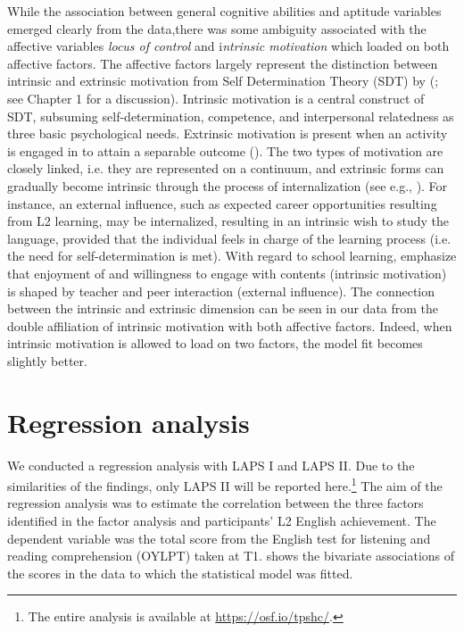 \documentclass[output=paper]{langsci/langscibook}
\begin{document}
While the association between general cognitive abilities and aptitude variables emerged clearly from the data,there was some ambiguity associated with the affective variables \textit{locus of control} and i\textit{ntrinsic motivation} which loaded on both affective factors. The affective factors largely represent the distinction between intrinsic and extrinsic motivation from Self Determination Theory (SDT) by \citeauthor{DeciRyan1985} (\citeyear{DeciRyan1985, DeciRyan2002}; see Chapter 1 for a discussion). Intrinsic motivation is a central construct of SDT, subsuming self-determination, competence, and interpersonal relatedness as three basic psychological needs. Extrinsic motivation is present when an activity is engaged in to attain a separable outcome (\citealt[60]{DeciRyan2000}). The two types of motivation are closely linked, i.e. they are represented on a continuum, and extrinsic forms can gradually become intrinsic through the process of internalization (see e.g., \citealt{DeciRyan1985}). For instance, an external influence, such as expected career opportunities resulting from L2 learning, may be internalized, resulting in an intrinsic wish to study the language, provided that the individual feels in charge of the learning process (i.e. the need for self-determination is met). With regard to school learning,  \citet[64]{DeciRyan2000} emphasize that enjoyment of and willingness to engage with contents (intrinsic motivation) is shaped by teacher and peer interaction (external influence). The connection between the intrinsic and extrinsic dimension can be seen in our data from the double affiliation of intrinsic motivation with both affective factors. Indeed, when intrinsic motivation is allowed to load on two factors, the model fit becomes slightly better.

\section{Regression analysis}

We conducted a regression analysis with LAPS I and LAPS II. Due to the similarities of the findings, only LAPS II will be reported here.\footnote{The entire analysis is available at \url{https://osf.io/tpshc/}.} The aim of the regression analysis was to estimate the correlation between the three factors identified in the factor analysis and participants’ L2 English achievement. The dependent variable was the total score from the English test for listening and reading comprehension (OYLPT) taken at T1.  shows the bivariate associations of the scores in the data to which the statistical model was fitted.
\end{document}
